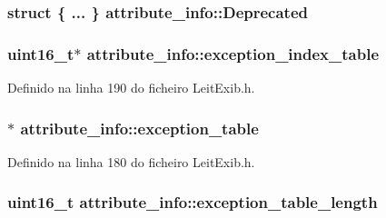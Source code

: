 \hypertarget{structattribute__info_ae4a470dfe9ebb19702f6b7f754f6c6af}{
\subsubsection[{Deprecated}]{\setlength{\rightskip}{0pt plus 5cm}struct \{ ... \}   attribute\-\_\-info\-::\-Deprecated}}\label{structattribute__info_ae4a470dfe9ebb19702f6b7f754f6c6af}
\hypertarget{structattribute__info_a38178aee6eed0ea3d063727fed9cd100}{
\subsubsection[{exception\-\_\-index\-\_\-table}]{\setlength{\rightskip}{0pt plus 5cm}uint16\-\_\-t$\ast$ attribute\-\_\-info\-::exception\-\_\-index\-\_\-table}}\label{structattribute__info_a38178aee6eed0ea3d063727fed9cd100}


Definido na linha 190 do ficheiro Leit\-Exib.\-h.

\hypertarget{structattribute__info_aae0418a699927d0113442ad9f8b71dfc}{
\subsubsection[{exception\-\_\-table}]{$\ast$ attribute\-\_\-info\-::exception\-\_\-table}}\label{structattribute__info_aae0418a699927d0113442ad9f8b71dfc}


Definido na linha 180 do ficheiro Leit\-Exib.\-h.

\hypertarget{structattribute__info_a6c6f8f7c78f29127b0e289c73516ddd7}{
\subsubsection[{exception\-\_\-table\-\_\-length}]{\setlength{\rightskip}{0pt plus 5cm}uint16\-\_\-t attribute\-\_\-info\-::exception\-\_\-table\-\_\-length}}\label{structattribute__info_a6c6f8f7c78f29127b0e289c73516ddd7}


